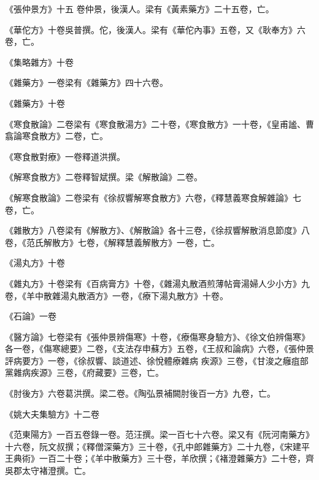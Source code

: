 \begin{pinyinscope}
 《張仲景方》十五
 卷仲景，後漢人。梁有《黃素藥方》二十五卷，亡。



 《華佗方》十卷吳普撰。佗，後漢人。梁有《華佗內事》五卷，又《耿奉方》六卷，亡。



 《集略雜方》十卷



 《雜藥方》一卷梁有《雜藥方》四十六卷。



 《雜藥方》十卷



 《寒食散論》二卷梁有《寒食散湯方》二十卷，《寒食散方》一十卷，《皇甫謐、曹翕論寒食散方》二卷，亡。



 《寒食散對療》一卷釋道洪撰。



 《解寒食散方》二卷釋智斌撰。梁《解散論》二卷。



 《解寒食散論》二卷梁有《徐叔響解寒食散方》六卷，《釋慧義寒食解雜論》七卷，亡。



 《雜散方》八卷梁有《解散方》、《解散論》各十三卷，《徐叔響解散消息節度》八卷，《范氏解散方》七卷，《解釋慧義解散方》一卷，亡。



 《湯丸方》十卷



 《雜丸方》十卷梁有《百病膏方》十卷，《雜湯丸散酒煎薄帖膏湯婦人少小方》九卷，《羊中散雜湯丸散酒方》一卷，《療下湯丸散方》十卷。



 《石論》一卷



 《醫方論》七卷梁有《張仲景辨傷寒》十卷，《療傷寒身驗方》、《徐文伯辨傷寒》各一卷，《傷寒總要》二卷，《支法存申蘇方》五卷，《王叔和論病》六卷，《張仲景評病要方》一卷，《徐叔響、談道述、徐悅體療雜病
 疾源》三卷，《甘浚之癰疽部黨雜病疾源》三卷，《府藏要》三卷，亡。



 《肘後方》六卷葛洪撰。梁二卷。《陶弘景補闕肘後百一方》九卷，亡。



 《姚大夫集驗方》十二卷



 《范東陽方》一百五卷錄一卷。范汪撰。梁一百七十六卷。梁又有《阮河南藥方》十六卷，阮文叔撰；《釋僧深藥方》三十卷，《孔中郎雜藥方》二十九卷，《宋建平王典術》一百二十卷；《羊中散藥方》三十卷，羊欣撰；《褚澄雜藥方》二十卷，齊吳郡太守褚澄撰。亡。




\end{pinyinscope}

